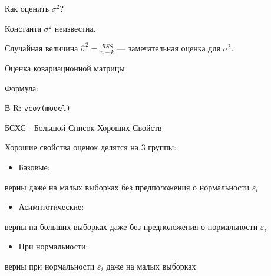 \documentclass[ignorenonframetext,]{beamer}
\begin{document}
\begin{frame}{Как оценить $\sigma^2$?}

Константа $\sigma^2$ неизвестна.

Случайная величина $\hat{\sigma}^2=\frac{RSS}{n-k}$ --- замечательная
оценка для $\sigma^2$.

\end{frame}

\begin{frame}{Оценка ковариационной матрицы}

Формула:

В R: \texttt{vcov(model)}

\end{frame}

\begin{frame}{БСХС - Большой Список Хороших Свойств}

Хорошие свойства оценок делятся на 3 группы:

\begin{itemize}
\itemsep1pt\parskip0pt
\item
  Базовые:
\end{itemize}

верны даже на малых выборках без предположения о нормальности
$\varepsilon_i$

\begin{itemize}
\itemsep1pt\parskip0pt
\item
  Асимптотические:
\end{itemize}

верны на больших выборках даже без предположения о нормальности
$\varepsilon_i$

\begin{itemize}
\itemsep1pt\parskip0pt
\item
  При нормальности:
\end{itemize}

верны при нормальности $\varepsilon_i$ даже на малых выборках

\end{frame}
\end{document}
